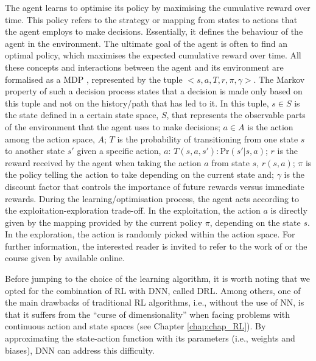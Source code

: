 \documentclass[12pt,letterpaper]{article}
\def\ie{i.e., }
\begin{document}
The agent learns to optimise its policy by maximising the cumulative reward over time. This policy refers to the strategy or mapping from states to actions that the agent employs to make decisions. Essentially, it defines the behaviour of the agent in the environment. The ultimate goal of the agent is often to find an optimal policy, which maximises the expected cumulative reward over time.  All these concepts and interactions between the agent and its environment are formalised as a \gls*{MDP} \cite{sutton2018reinforcement}, represented by the tuple $<s,a,T,r,\pi,\gamma>$.  The Markov property of such a decision process states that a decision is made only based on this tuple and not on the history/path that has led to it. In this tuple, $s\in S$ is the state defined in a certain state space, $S$, that represents the observable parts of the environment that the agent uses to make decisions; $a\in A$ is the action among the action space, $A$; $T$ is the probability of transitioning from one state $s$ to another state $s'$ given a specific action, $a$: $T(s,a,s'): \text{Pr}\left(s'|s,a\right)$; $r$ is the reward received by the agent when taking the action $a$ from state $s$, $r(s,a)$; $\pi$ is the policy telling the action to take depending on the current state and; $\gamma$ is the discount factor that controls the importance of future rewards versus immediate rewards. During the learning/optimisation process, the agent acts according to the exploitation-exploration trade-off. In the exploitation, the action $a$ is directly given by the mapping provided by the current policy $\pi$,  depending on the state $s$. In the exploration, the action is randomly picked within the action space. For further information, the interested reader is invited to refer to the work of \citet{sutton2018reinforcement} or the course given by \citet{davidsilver_RL_online} available online.

Before jumping to the choice of the learning algorithm, it is worth noting that we opted for the combination of \gls*{RL} with \gls*{DNN}, called \gls*{DRL}. Among others, one of the main drawbacks of traditional \gls*{RL} algorithms, \ie without the use of \gls*{NN},  is that it suffers from the ``curse of dimensionality'' when facing problems with continuous action and state spaces (see Chapter \ref{chap:chap_RL}). By approximating the state-action function with its parameters (\ie weights and biases), \gls*{DNN} can address this difficulty. 
\end{document}
